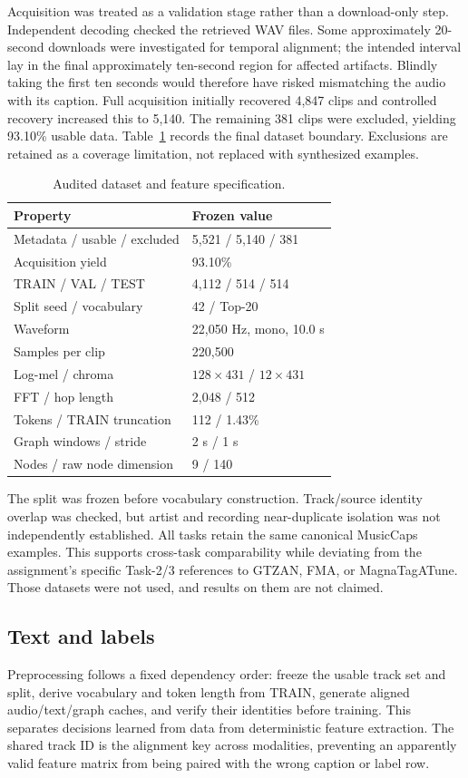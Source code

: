 \documentclass[conference]{IEEEtran}
\begin{document}
Acquisition was treated as a validation stage rather than a download-only step. Independent decoding checked the retrieved WAV files. Some approximately 20-second downloads were investigated for temporal alignment; the intended interval lay in the final approximately ten-second region for affected artifacts. Blindly taking the first ten seconds would therefore have risked mismatching the audio with its caption. Full acquisition initially recovered 4,847 clips and controlled recovery increased this to 5,140. The remaining 381 clips were excluded, yielding 93.10\% usable data. Table~\ref{tab:data} records the final dataset boundary. Exclusions are retained as a coverage limitation, not replaced with synthesized examples.
\begin{table}[t]
\caption{Audited dataset and feature specification.}\label{tab:data}
\centering\small
\begin{tabular}{@{}ll@{}}\toprule
Property & Frozen value\\\midrule
Metadata / usable / excluded & 5,521 / 5,140 / 381\\
Acquisition yield & 93.10\%\\
TRAIN / VAL / TEST & 4,112 / 514 / 514\\
Split seed / vocabulary & 42 / Top-20\\
Waveform & 22,050 Hz, mono, 10.0 s\\
Samples per clip & 220,500\\
Log-mel / chroma & $128\times431$ / $12\times431$\\
FFT / hop length & 2,048 / 512\\
Tokens / TRAIN truncation & 112 / 1.43\%\\
Graph windows / stride & 2 s / 1 s\\
Nodes / raw node dimension & 9 / 140\\\bottomrule
\end{tabular}
\end{table}

The split was frozen before vocabulary construction. Track/source identity overlap was checked, but artist and recording near-duplicate isolation was not independently established. All tasks retain the same canonical MusicCaps examples. This supports cross-task comparability while deviating from the assignment's specific Task-2/3 references to GTZAN, FMA, or MagnaTagATune. Those datasets were not used, and results on them are not claimed.

\subsection{Text and labels}
Preprocessing follows a fixed dependency order: freeze the usable track set and split, derive vocabulary and token length from TRAIN, generate aligned audio/text/graph caches, and verify their identities before training. This separates decisions learned from data from deterministic feature extraction. The shared track ID is the alignment key across modalities, preventing an apparently valid feature matrix from being paired with the wrong caption or label row.
\end{document}
